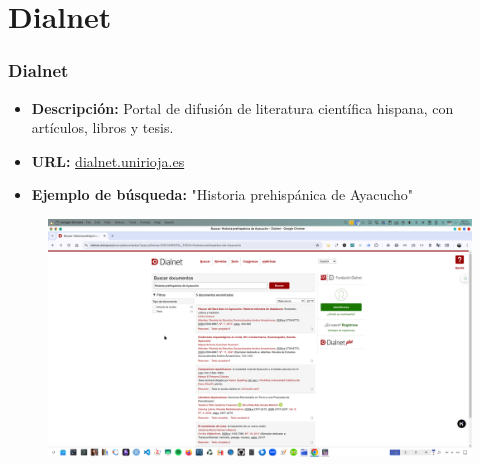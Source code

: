 \documentclass[
11pt, %
]{beamer}
\begin{document}
\section{Dialnet}
\begin{frame}
	\frametitle{Dialnet}
	\begin{itemize}
		\item \textbf{Descripción:} Portal de difusión de literatura científica hispana, con artículos, libros y tesis.
		\item \textbf{URL:} \href{https://dialnet.unirioja.es}{dialnet.unirioja.es}
		\item \textbf{Ejemplo de búsqueda:} "Historia prehispánica de Ayacucho"
	\end{itemize}
		\begin{figure}
		\centering
		\includegraphics[width=0.9\linewidth]{images/dialnet.png}
		\label{fig:screenshot010}
	\end{figure}
\end{frame}

\end{document}

